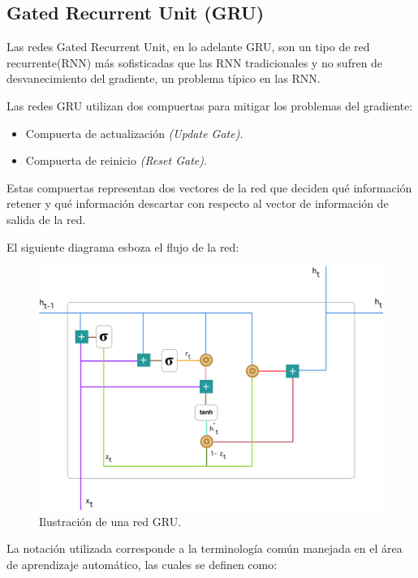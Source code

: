 \documentclass[12pt, letterpaper]{article}
\begin{document}
    \subsection{Gated Recurrent Unit (GRU)}
    Las redes Gated Recurrent Unit, en lo adelante GRU, son un tipo de red recurrente(RNN) más sofisticadas que las RNN tradicionales y no sufren de desvanecimiento del gradiente, un problema típico en las RNN.
    
    Las redes GRU utilizan dos compuertas para mitigar los problemas del gradiente:
    \begin{itemize}
        \item Compuerta de actualización \emph{(Update Gate)}.
        \item Compuerta de reinicio \emph{(Reset Gate)}.
    \end{itemize}
    
    Estas compuertas representan dos vectores de la red que deciden qué información retener y qué información descartar con respecto al vector de información de salida de la red.
    
    El siguiente diagrama esboza el flujo de la red:

        \begin{figure}[H]
            \centering
            \includegraphics[width=0.8\linewidth]{img/gru_net.png}
            \caption{Ilustración de una red GRU.}
        \end{figure}

    La notación utilizada corresponde a la terminología común manejada en el área de aprendizaje automático, las cuales se definen como:
    
\end{document}
